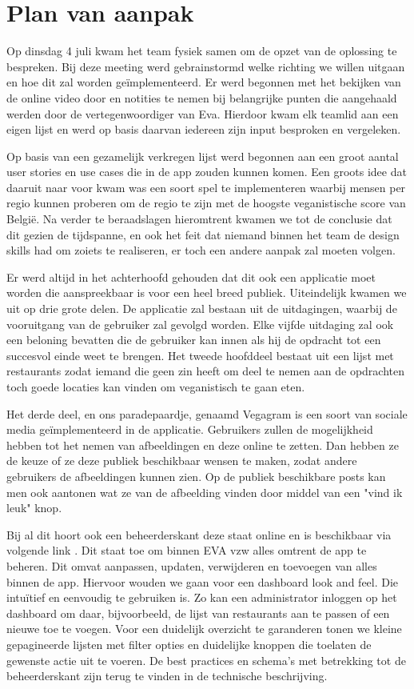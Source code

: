 \chapter{Plan van aanpak}
\label{ch:pva}

Op dinsdag 4 juli kwam het team fysiek samen om de opzet van de oplossing te bespreken. Bij deze meeting werd gebrainstormd welke richting we willen uitgaan en hoe dit zal worden geïmplementeerd. Er werd begonnen met het bekijken van de online video door \textcite{eva_video} en notities te nemen bij belangrijke punten die aangehaald werden door de vertegenwoordiger van Eva. Hierdoor kwam elk teamlid aan een eigen lijst en werd op basis daarvan iedereen zijn input besproken en vergeleken. 

Op basis van een gezamelijk verkregen lijst werd begonnen aan een groot aantal user stories en use cases die in de app zouden kunnen komen. Een groots idee dat daaruit naar voor kwam was een soort spel te implementeren waarbij mensen per regio kunnen proberen om de regio te zijn met de hoogste veganistische score van België. Na verder te beraadslagen hieromtrent kwamen we tot de conclusie dat dit gezien de tijdspanne, en ook het feit dat niemand binnen het team de design skills had om zoiets te realiseren, er toch een andere aanpak zal moeten volgen.

Er werd altijd in het achterhoofd gehouden dat dit ook een applicatie moet worden die aanspreekbaar is voor een heel breed publiek. Uiteindelijk kwamen we uit op drie grote delen. De applicatie zal bestaan uit de uitdagingen, waarbij de vooruitgang van de gebruiker zal gevolgd worden. Elke vijfde uitdaging zal ook een beloning bevatten die de gebruiker kan innen als hij de opdracht tot een succesvol einde weet te brengen. Het tweede hoofddeel bestaat uit een lijst met restaurants zodat iemand die geen zin heeft om deel te nemen aan de opdrachten toch goede locaties kan vinden om veganistisch te gaan eten. 

Het derde deel, en ons paradepaardje, genaamd Vegagram is een soort van sociale media geïmplementeerd in de applicatie. Gebruikers zullen de mogelijkheid hebben tot het nemen van afbeeldingen en deze online te zetten. Dan hebben ze de keuze of ze deze publiek beschikbaar wensen te maken, zodat andere gebruikers de afbeeldingen kunnen zien. Op de publiek beschikbare posts kan men ook aantonen wat ze van de afbeelding vinden door middel van een "vind ik leuk" knop.

Bij al dit hoort ook een beheerderskant deze staat online en is beschikbaar via volgende link \autocite{dashboard}. Dit staat toe om binnen EVA vzw alles omtrent de app te beheren. Dit omvat aanpassen, updaten, verwijderen en toevoegen van alles binnen de app. Hiervoor wouden we gaan voor een dashboard look and feel. Die intuïtief en eenvoudig te gebruiken is. Zo kan een administrator inloggen op het dashboard om daar, bijvoorbeeld, de lijst van restaurants aan te passen of een nieuwe toe te voegen. Voor een duidelijk overzicht te garanderen tonen we kleine gepagineerde lijsten met filter opties en duidelijke knoppen die toelaten de gewenste actie uit te voeren. De best practices en schema's met betrekking tot de beheerderskant zijn terug te vinden in de technische beschrijving.
